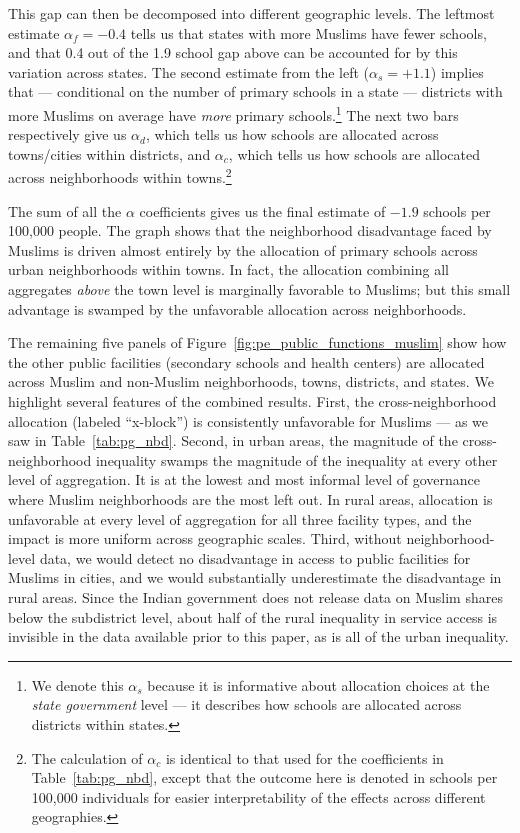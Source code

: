 \documentclass[12pt]{article}
\begin{document}
This gap can then be decomposed into different geographic levels. The leftmost estimate $\alpha_f=-0.4$ tells us that states with more Muslims have fewer schools, and that 0.4 out of the 1.9 school gap above can be accounted for by this variation across states. The second estimate from the left ($\alpha_s=+1.1$) implies that --- conditional on the number of primary schools in a state --- districts with more Muslims on average have \textit{more} primary schools.\footnote{We denote this $\alpha_s$ because it is informative about allocation choices at the \textit{state government} level --- it describes how schools are allocated across districts within states.} The next two bars respectively give us $\alpha_d$, which tells us how schools are allocated across towns/cities within districts, and $\alpha_c$, which tells us how schools are allocated across neighborhoods within towns.\footnote{The calculation of $\alpha_c$ is identical to that used for the coefficients in Table~\ref{tab:pg_nbd}, except that the outcome here is denoted in schools per 100,000 individuals for easier interpretability of the effects across different geographies.}

The sum of all the $\alpha$ coefficients gives us the final estimate of $-1.9$ schools per 100,000 people. The graph shows that the neighborhood disadvantage faced by Muslims is driven almost entirely by the allocation of primary schools across urban neighborhoods within towns. In fact, the allocation combining all aggregates \textit{above} the town level is marginally favorable to Muslims; but this small advantage is swamped by the unfavorable allocation across neighborhoods.

The remaining five panels of Figure~\ref{fig:pe_public_functions_muslim} show how the other public facilities (secondary schools and health centers) are allocated across Muslim and non-Muslim neighborhoods, towns, districts, and states. We highlight several features of the combined results. First, the cross-neighborhood allocation (labeled ``x-block'') is consistently unfavorable for Muslims --- as we saw in Table~\ref{tab:pg_nbd}. Second, in urban areas, the magnitude of the cross-neighborhood inequality swamps the magnitude of the inequality at every other level of aggregation. It is at the lowest and most informal level of governance where Muslim neighborhoods are the most left out. In rural areas, allocation is unfavorable at every level of aggregation for all three facility types, and the impact is more uniform across geographic scales. Third, without neighborhood-level data, we would detect no disadvantage in access to public facilities for Muslims in cities, and we would substantially underestimate the disadvantage in rural areas. Since the Indian government does not release data on Muslim shares below the subdistrict level, about half of the rural inequality in service access is invisible in the data available prior to this paper, as is all of the urban inequality.
\end{document}
